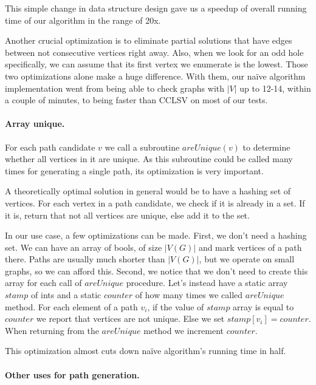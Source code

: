 This simple change in data structure design gave us a speedup of overall running time of our algorithm in the range of 20x.

Another crucial optimization is to eliminate partial solutions that have edges between not consecutive vertices right away. Also, when we look for an odd hole specifically, we can assume that its first vertex we enumerate is the lowest. Those two optimizations alone make a huge difference. With them, our na\"ive algorithm implementation went from being able to check graphs with $|V|$ up to 12-14, within a couple of minutes, to being faster than CCLSV on most of our tests.

\paragraph{Array unique.}

For each path candidate $v$ we call a subroutine $areUnique(v)$ to determine whether all vertices in it are unique. As this subroutine could be called many times for generating a single path, its optimization is very important.

A theoretically optimal solution in general would be to have a hashing set of vertices. For each vertex in a path candidate, we check if it is already in a set. If it is, return that not all vertices are unique, else add it to the set.

In our use case, a few optimizations can be made. First, we don't need a hashing set. We can have an array of bools, of size $|V(G)|$ and mark vertices of a path there. Paths are usually much shorter than $|V(G)|$, but we operate on small graphs, so we can afford this. Second, we notice that we don't need to create this array for each call of $areUnique$ procedure. Let's instead have a static array $stamp$ of ints and a static $counter$ of how many times we called $areUnique$ method. For each element of a path $v_i$, if the value of $stamp$ array is equal to $counter$ we report that vertices are not unique. Else we set $stamp[v_i] = counter$. When returning from the $areUnique$ method we increment $counter$.

This optimization almost cuts down na\"ive algorithm's running time in half.

\paragraph{Other uses for path generation.}
\label{sec:usesGeneration}


